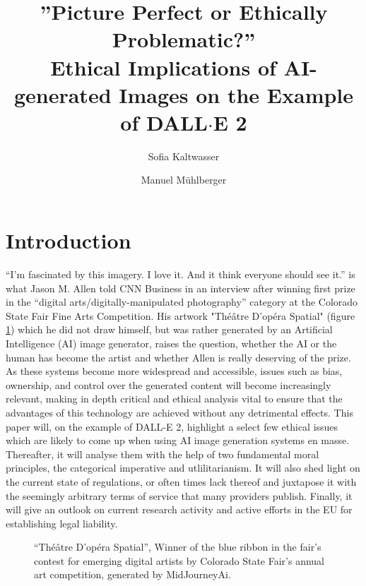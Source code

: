 \documentclass[9pt,twocolumn,twoside]{osajnl}
\title{”Picture Perfect or Ethically Problematic?” \\ Ethical Implications of AI-generated Images on the Example of DALL$\cdot$E 2}
\author[1]{Sofia Kaltwasser}
\author[2]{Manuel Mühlberger}
\affil[1]{University of Potsdam}
\affil[2]{School of Computation, Information and Technology, TU Munich}
\begin{document}
\maketitle

\section{Introduction}
“I’m fascinated by this imagery. I love it. And it think everyone should see it.” is what Jason M. Allen told CNN Business in an interview after winning first prize in the “digital arts/digitally-manipulated photography” category at the Colorado State Fair Fine Arts Competition\cite{JasonMAllenCNN}.
His artwork "Théâtre D’opéra Spatial" (figure \ref{Theatre}) which he did not draw himself, but was rather generated by an Artificial Intelligence (AI) image generator, raises the question, whether the AI or the human has become the artist and whether Allen is really deserving of the prize.
As these systems become more widespread and accessible, issues such as bias, ownership, and control over the generated content will become increasingly relevant, making in depth critical and ethical analysis vital to ensure that the advantages of this technology are achieved without any detrimental effects. 
This paper will, on the example of DALL-E 2, highlight a select few ethical issues which are likely to come up when using AI image generation systems en masse. 
Thereafter, it will analyse them with the help of two fundamental moral principles, the categorical imperative and utlilitarianism. 
It will also shed light on the current state of regulations, or often times lack thereof and juxtapose it with the seemingly arbitrary terms of service that many providers publish. 
Finally, it will give an outlook on current research activity and active efforts in the EU for establishing legal liability. 
\begin{figure}[htbp]
	\centering
	\caption{“Théâtre D’opéra Spatial”, Winner of the blue ribbon in the fair’s contest for emerging digital artists by Colorado State Fair’s annual art competition, generated by MidJourneyAi\cite{OperaSpecial}.}
	\label{Theatre}
\end{figure}
\end{document}
